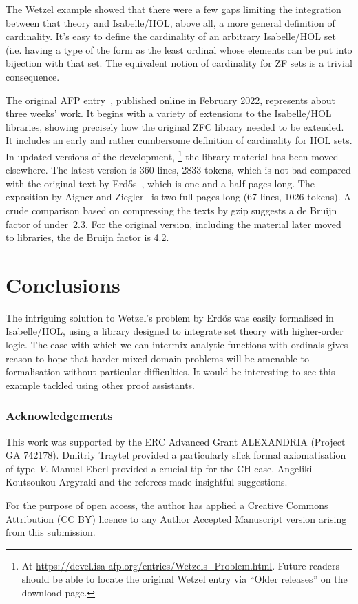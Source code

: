 \documentclass[runningheads]{llncs}
\begin{document}
The Wetzel example showed that there were a few gaps limiting the integration between that theory and Isabelle/HOL, above all, a more general definition of cardinality. It's easy to define the cardinality of an arbitrary Isabelle/HOL set (i.e. having a type of the form  as the least ordinal whose elements can be put into bijection with that set.
The equivalent notion of cardinality for ZF sets is a trivial consequence.

The original AFP entry~\cite{Wetzels_Problem-AFP}, published online in February 2022, represents about three weeks' work.
It begins with a variety of extensions to the Isabelle/HOL libraries, showing precisely how the original ZFC library needed to be extended.
It includes an early and rather cumbersome definition of cardinality for HOL sets. In updated versions of the development,%
\footnote{At \url{https://devel.isa-afp.org/entries/Wetzels_Problem.html}. Future readers should be able to locate the original Wetzel entry via ``Older releases'' on the download page.}
%
the library material has been moved elsewhere. The latest version is 360 lines, 2833 tokens, which is not bad compared with the original text by Erdős~\cite{erdos-interpolation}, which is one and a half pages long. The exposition by Aigner and Ziegler~\cite{aigner-proofs} is two full pages long (67 lines, 1026 tokens). A crude comparison based on compressing the texts by gzip suggests a de Bruijn factor of under~2.3. For the original version, including the material later moved to libraries, the de Bruijn factor is 4.2.

\section{Conclusions}

The intriguing solution to Wetzel's problem by Erd\H{o}s was easily formalised in Isabelle/HOL, using a library designed to integrate set theory with higher-order logic.
The ease with which we can intermix analytic functions with ordinals gives reason to hope that harder mixed-domain problems will be amenable to formalisation without particular difficulties.
It would be interesting to see this example tackled using other proof assistants.

\subsubsection{Acknowledgements} 
This work was supported by the ERC Advanced Grant ALEXANDRIA (Project GA 742178). 
Dmitriy Traytel provided a particularly slick formal axiomatisation of type~$V$. 
Manuel Eberl provided a crucial tip for the CH case.
Angeliki Koutsoukou-Argyraki and the referees made insightful suggestions.

For the purpose of open access, the author has applied a Creative Commons Attribution (CC BY) licence to any Author Accepted Manuscript version arising from this submission.




\end{document}
